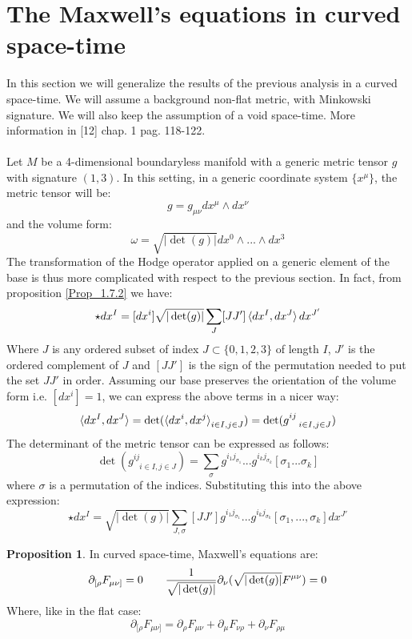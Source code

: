 \documentclass[12pt,a4paper]{report}
\theoremstyle{definition}
\theoremstyle{Theorem}
\newtheorem{Prop}[Def]{Proposition}
\theoremstyle{definition}
\theoremstyle{definition}
\begin{document}
	\section{The Maxwell's equations in curved space-time}
	In this section we will generalize the results of the previous analysis in a curved space-time. We will assume a background non-flat metric, with Minkowski signature. We will also keep the assumption of a void space-time. More information in [12] chap. 1 pag. 118-122.
	\\\\
	Let $M$ be a 4-dimensional boundaryless manifold with a generic metric tensor $g$ with signature $(1,3)$. In this setting, in a generic coordinate system $\{x^\mu\}$, the metric tensor will be:
	$$g=g_{\mu\nu}dx^\mu\wedge dx^\nu$$
	and the volume form:
	$$\omega=\sqrt{|\det(g)|}dx^0\wedge...\wedge dx^3$$
	The transformation of the Hodge operator applied on a generic element of the base is thus more complicated with respect to the previous section. In fact, from proposition \ref{Prop_1.7.2} we have:
	$$\star dx^I=[dx^i]\sqrt{|\det(g)|}\sum_J [JJ']\braket{dx^I,dx^J}dx^{J'}$$
	Where $J$ is any ordered subset of index $J\subset\{0,1,2,3\}$ of length $I$, $J'$ is the ordered complement of $J$ and $[JJ']$ is the sign of the permutation needed to put the set $JJ'$ in order.
	Assuming our base preserves the orientation of the volume form i.e. $[dx^i]=1$, we can express the above terms in a nicer way:
	$$\braket{dx^I,dx^J}=\det(\braket{dx^i,dx^j}_{i\in I,j\in J})=\det(g^{ij}_{\hspace{9pt}i\in I,j\in J})$$
	The determinant of the metric tensor can be expressed as follows:
	$$\det(g^{ij}_{\hspace{9pt}i\in I,j\in J})=\sum_\sigma g^{i_1j_{\sigma_1}}...g^{i_kj_{\sigma_k}}[\sigma_1...\sigma_k]$$
	where $\sigma$ is a permutation of the indices. Substituting this into the above expression:
	\begin{equation}\label{star_dx}
		\star dx^I=\sqrt{|\det(g)|}\sum_{J,\sigma} [JJ']g^{i_1j_{\sigma_1}}...g^{i_kj_{\sigma_k}}[\sigma_1,...,\sigma_k]dx^{J'}
	\end{equation}
	\begin{Prop}
		In curved space-time, Maxwell's equations are:
		\begin{equation}
			\partial_{[\rho} F_{\mu\nu]}=0\hspace{20 pt} {1\over \sqrt{|\det(g)|}}\partial_\nu (\sqrt{|\det(g)|}F^{\mu\nu})=0
		\end{equation}
		Where, like in the flat case:
		$$\partial_{[\rho} F_{\mu\nu]}=\partial_\rho F_{\mu\nu}+\partial_\mu F_{\nu\rho}+\partial_\nu F_{\rho\mu}$$
	\end{Prop}
\end{document}
